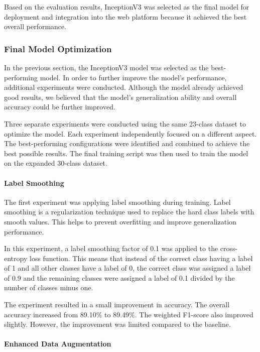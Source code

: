 Based on the evaluation results, InceptionV3 was selected as the final model
for deployment and integration into the web platform because it achieved the
best overall performance.

\subsubsection{Final Model Optimization}

In the previous section, the InceptionV3 model was selected as the best-performing model.
In order to further improve the model's performance, additional experiments were conducted.
Although the model already achieved good results, we believed that the model's generalization
ability and overall accuracy could be further improved.

Three separate experiments were conducted using the same 23-class dataset to optimize the model. 
Each experiment independently focused on a different aspect. The best-performing configurations 
were identified and combined to achieve the best possible results. The final training script was 
then used 
to train the model on the expanded 30-class dataset.

\paragraph{Label Smoothing}

The first experiment was applying label smoothing during training. Label smoothing is a regularization
technique used to replace the hard class labels with smooth values. This helps to prevent overfitting 
and improve generalization performance.

In this experiment, a label smoothing factor of 0.1 was applied to the cross-entropy loss function. 
This means that instead of the correct class having a label of 1 and all other classes have a label 
of 0, 
the correct class was assigned a label of 0.9 and the remaining classes were assigned a label of 0.1 
divided by the number of classes minus one.

The experiment resulted in a small improvement in accuracy. The overall accuracy increased from 89.10\% 
to 89.49\%.
The weighted F1-score also improved slightly. However, the improvement was limited compared to the 
baseline.

\paragraph{Enhanced Data Augmentation}

